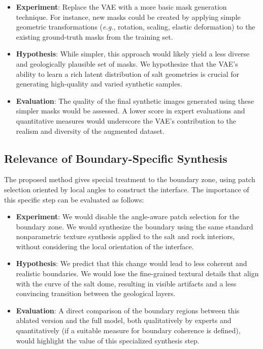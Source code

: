 \documentclass{ieeeaccess}
\begin{document}
\begin{itemize}
    \item \textbf{Experiment}: Replace the VAE with a more basic mask generation technique. For instance, new masks could be created by applying simple geometric transformations (\emph{e.g.}, rotation, scaling, elastic deformation) to the existing ground-truth masks from the training set.
    \item \textbf{Hypothesis}: While simpler, this approach would likely yield a less diverse and geologically plausible set of masks. We hypothesize that the VAE's ability to learn a rich latent distribution of salt geometries is crucial for generating high-quality and varied synthetic samples.
    \item \textbf{Evaluation}: The quality of the final synthetic images generated using these simpler masks would be assessed. A lower score in expert evaluations and quantitative measures would underscore the VAE's contribution to the realism and diversity of the augmented dataset.
\end{itemize}

\subsection{Relevance of Boundary-Specific Synthesis}

The proposed method gives special treatment to the boundary zone, using patch selection oriented by local angles to construct the interface. The importance of this specific step can be evaluated as follows:

\begin{itemize}
    \item \textbf{Experiment}: We would disable the angle-aware patch selection for the boundary zone. We would synthesize the boundary using the same standard nonparametric texture synthesis applied to the salt and rock interiors, without considering the local orientation of the interface.
    \item \textbf{Hypothesis}: We predict that this change would lead to less coherent and realistic boundaries. We would lose the fine-grained textural details that align with the curve of the salt dome, resulting in visible artifacts and a less convincing transition between the geological layers.
    \item \textbf{Evaluation}: A direct comparison of the boundary regions between this ablated version and the full model, both qualitatively by experts and quantitatively (if a suitable measure for boundary coherence is defined), would highlight the value of this specialized synthesis step.
\end{itemize}
\end{document}
